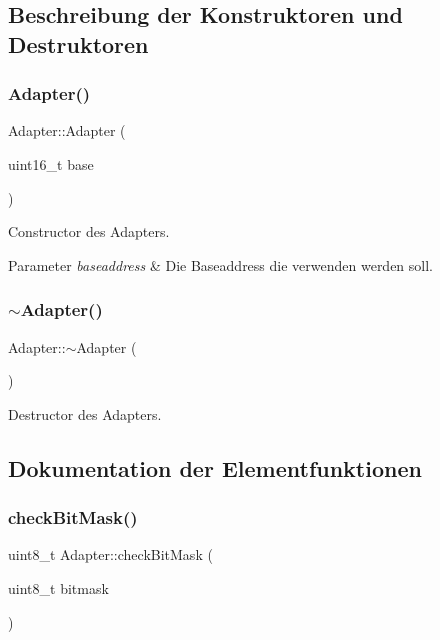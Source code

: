 \subsection{Beschreibung der Konstruktoren und Destruktoren}
\hypertarget{class_adapter_ae2c6ad0390905b82cac4077642b36620}{}\label{class_adapter_ae2c6ad0390905b82cac4077642b36620} 
\subsubsection{\texorpdfstring{Adapter()}{Adapter()}}
{\footnotesize\ttfamily Adapter\+::\+Adapter (\begin{DoxyParamCaption}\item[{uint16\+\_\+t}]{base }\end{DoxyParamCaption})}

Constructor des Adapters.


\begin{DoxyParams}{Parameter}
{\em baseaddress} & Die Baseaddress die verwenden werden soll. \\
\hline
\end{DoxyParams}
\hypertarget{class_adapter_a08a07acff57eb40aba27455de23ed13c}{}\label{class_adapter_a08a07acff57eb40aba27455de23ed13c} 
\subsubsection{\texorpdfstring{$\sim$\+Adapter()}{~Adapter()}}
{\footnotesize\ttfamily Adapter\+::$\sim$\+Adapter (\begin{DoxyParamCaption}{ }\end{DoxyParamCaption})}

Destructor des Adapters. 

\subsection{Dokumentation der Elementfunktionen}
\hypertarget{class_adapter_a8b1478082798b063a0c04d98fdea06a2}{}\label{class_adapter_a8b1478082798b063a0c04d98fdea06a2} 
\subsubsection{\texorpdfstring{check\+Bit\+Mask()}{checkBitMask()}}
{\footnotesize\ttfamily uint8\+\_\+t Adapter\+::check\+Bit\+Mask (\begin{DoxyParamCaption}\item[{uint8\+\_\+t}]{bitmask }\end{DoxyParamCaption})}


